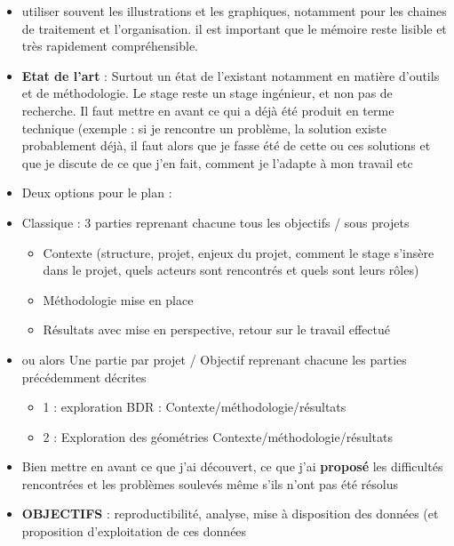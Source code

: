 \documentclass[
  12pt,
  a4paperpaper,
]{book}
\providecommand{\tightlist}{%
  \setlength{\itemsep}{0pt}\setlength{\parskip}{0pt}}\usepackage{longtable,booktabs,array}
\begin{document}
\begin{itemize}
\item
  utiliser souvent les illustrations et les graphiques, notamment pour
  les chaines de traitement et l'organisation. il est important que le
  mémoire reste lisible et très rapidement compréhensible.
\item
  \textbf{Etat de l'art} : Surtout un état de l'existant notamment en
  matière d'outils et de méthodologie. Le stage reste un stage
  ingénieur, et non pas de recherche. Il faut mettre en avant ce qui a
  déjà été produit en terme technique (exemple : si je rencontre un
  problème, la solution existe probablement déjà, il faut alors que je
  fasse été de cette ou ces solutions et que je discute de ce que j'en
  fait, comment je l'adapte à mon travail etc
\item
  Deux options pour le plan :
\item
  Classique : 3 parties reprenant chacune tous les objectifs / sous
  projets

  \begin{itemize}
  \tightlist
  \item
    Contexte (structure, projet, enjeux du projet, comment le stage
    s'insère dans le projet, quels acteurs sont rencontrés et quels sont
    leurs rôles)
  \item
    Méthodologie mise en place
  \item
    Résultats avec mise en perspective, retour sur le travail effectué
  \end{itemize}
\item
  ou alors Une partie par projet / Objectif reprenant chacune les
  parties précédemment décrites

  \begin{itemize}
  \tightlist
  \item
    1 : exploration BDR : Contexte/méthodologie/résultats
  \item
    2 : Exploration des géométries Contexte/méthodologie/résultats
  \end{itemize}
\item
  Bien mettre en avant ce que j'ai découvert, ce que j'ai
  \textbf{proposé} les difficultés rencontrées et les problèmes soulevés
  même s'ils n'ont pas été résolus
\item
  \textbf{OBJECTIFS} : reproductibilité, analyse, mise à disposition des
  données (et proposition d'exploitation de ces données
\end{itemize}

\end{document}
